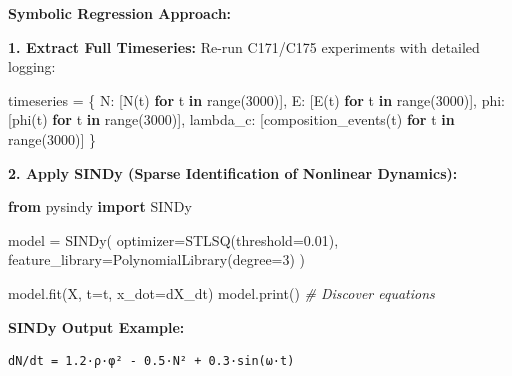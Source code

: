 \documentclass[
]{article}
\newenvironment{Shaded}{}{}
\newcommand{\BuiltInTok}[1]{\textcolor[rgb]{0.00,0.50,0.00}{#1}}
\newcommand{\CommentTok}[1]{\textcolor[rgb]{0.38,0.63,0.69}{\textit{#1}}}
\newcommand{\ControlFlowTok}[1]{\textcolor[rgb]{0.00,0.44,0.13}{\textbf{#1}}}
\newcommand{\DecValTok}[1]{\textcolor[rgb]{0.25,0.63,0.44}{#1}}
\newcommand{\FloatTok}[1]{\textcolor[rgb]{0.25,0.63,0.44}{#1}}
\newcommand{\ImportTok}[1]{\textcolor[rgb]{0.00,0.50,0.00}{\textbf{#1}}}
\newcommand{\KeywordTok}[1]{\textcolor[rgb]{0.00,0.44,0.13}{\textbf{#1}}}
\newcommand{\NormalTok}[1]{#1}
\newcommand{\OperatorTok}[1]{\textcolor[rgb]{0.40,0.40,0.40}{#1}}
\newcommand{\StringTok}[1]{\textcolor[rgb]{0.25,0.44,0.63}{#1}}
\begin{document}
\textbf{Symbolic Regression Approach:}

\textbf{1. Extract Full Timeseries:} Re-run C171/C175 experiments with
detailed logging:

\begin{Shaded}
\begin{Highlighting}[]
\NormalTok{timeseries }\OperatorTok{=}\NormalTok{ \{}
    \StringTok{\textquotesingle{}N\textquotesingle{}}\NormalTok{: [N(t) }\ControlFlowTok{for}\NormalTok{ t }\KeywordTok{in} \BuiltInTok{range}\NormalTok{(}\DecValTok{3000}\NormalTok{)],}
    \StringTok{\textquotesingle{}E\textquotesingle{}}\NormalTok{: [E(t) }\ControlFlowTok{for}\NormalTok{ t }\KeywordTok{in} \BuiltInTok{range}\NormalTok{(}\DecValTok{3000}\NormalTok{)],}
    \StringTok{\textquotesingle{}phi\textquotesingle{}}\NormalTok{: [phi(t) }\ControlFlowTok{for}\NormalTok{ t }\KeywordTok{in} \BuiltInTok{range}\NormalTok{(}\DecValTok{3000}\NormalTok{)],}
    \StringTok{\textquotesingle{}lambda\_c\textquotesingle{}}\NormalTok{: [composition\_events(t) }\ControlFlowTok{for}\NormalTok{ t }\KeywordTok{in} \BuiltInTok{range}\NormalTok{(}\DecValTok{3000}\NormalTok{)]}
\NormalTok{\}}
\end{Highlighting}
\end{Shaded}

\textbf{2. Apply SINDy (Sparse Identification of Nonlinear Dynamics):}

\begin{Shaded}
\begin{Highlighting}[]
\ImportTok{from}\NormalTok{ pysindy }\ImportTok{import}\NormalTok{ SINDy}

\NormalTok{model }\OperatorTok{=}\NormalTok{ SINDy(}
\NormalTok{    optimizer}\OperatorTok{=}\NormalTok{STLSQ(threshold}\OperatorTok{=}\FloatTok{0.01}\NormalTok{),}
\NormalTok{    feature\_library}\OperatorTok{=}\NormalTok{PolynomialLibrary(degree}\OperatorTok{=}\DecValTok{3}\NormalTok{)}
\NormalTok{)}

\NormalTok{model.fit(X, t}\OperatorTok{=}\NormalTok{t, x\_dot}\OperatorTok{=}\NormalTok{dX\_dt)}
\NormalTok{model.}\BuiltInTok{print}\NormalTok{()  }\CommentTok{\# Discover equations}
\end{Highlighting}
\end{Shaded}

\textbf{SINDy Output Example:}

\begin{verbatim}
dN/dt = 1.2·ρ·φ² - 0.5·N² + 0.3·sin(ω·t)
\end{verbatim}
\end{document}
